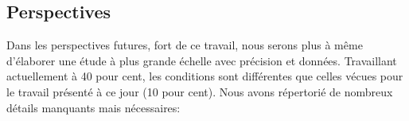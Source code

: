 



\subsection{Perspectives}
Dans les perspectives futures, fort de ce travail, nous serons plus à
même d'élaborer une étude à plus grande échelle avec précision et données.
 Travaillant
actuellement à 40 pour
cent, les conditions sont différentes que celles vécues pour le
travail présenté à ce jour (10 pour cent). Nous  avons répertorié 
de nombreux détails manquants mais nécessaires: 
